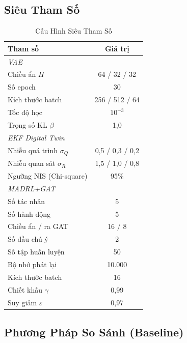 \documentclass[12pt, a4paper]{article}
\begin{document}
\subsection{Siêu Tham Số}

\begin{table}[H]
\centering
\caption{Cấu Hình Siêu Tham Số}
\label{tab:hyperparams}
\begin{tabular}{lc}
\toprule
\textbf{Tham số} & \textbf{Giá trị} \\
\midrule
\multicolumn{2}{l}{\textit{VAE}} \\
Chiều ẩn $H$              & 64 / 32 / 32 \\
Số epoch                   & 30 \\
Kích thước batch           & 256 / 512 / 64 \\
Tốc độ học                 & $10^{-3}$ \\
Trọng số KL $\beta$        & 1,0 \\
\midrule
\multicolumn{2}{l}{\textit{EKF Digital Twin}} \\
Nhiễu quá trình $\sigma_Q$ & 0,5 / 0,3 / 0,2 \\
Nhiễu quan sát $\sigma_R$  & 1,5 / 1,0 / 0,8 \\
Ngưỡng NIS (Chi-square)    & 95\% \\
\midrule
\multicolumn{2}{l}{\textit{MADRL+GAT}} \\
Số tác nhân                & 5 \\
Số hành động               & 5 \\
Chiều ẩn / ra GAT          & 16 / 8 \\
Số đầu chú ý               & 2 \\
Số tập huấn luyện          & 50 \\
Bộ nhớ phát lại            & 10.000 \\
Kích thước batch           & 16 \\
Chiết khấu $\gamma$        & 0,99 \\
Suy giảm $\varepsilon$     & 0,97 \\
\bottomrule
\end{tabular}
\end{table}

\subsection{Phương Pháp So Sánh (Baseline)}
\label{subsec:baseline_note}
\end{document}
